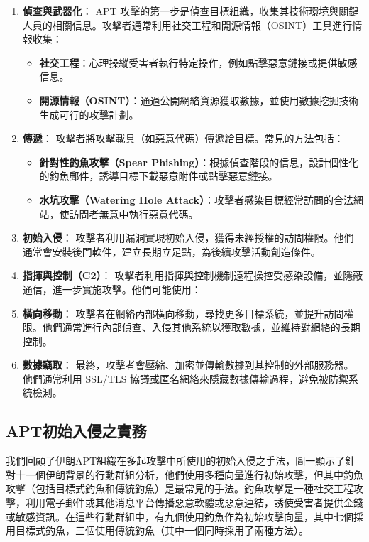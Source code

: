 \documentclass[a4paper,12pt]{article}
\begin{document}
\begin{enumerate}
    \item \textbf{偵查與武器化}：
    APT 攻擊的第一步是偵查目標組織，收集其技術環境與關鍵人員的相關信息。攻擊者通常利用社交工程和開源情報（OSINT）工具進行情報收集：
    \begin{itemize}
        \item \textbf{社交工程}：心理操縱受害者執行特定操作，例如點擊惡意鏈接或提供敏感信息。
        \item \textbf{開源情報（OSINT）}：通過公開網絡資源獲取數據，並使用數據挖掘技術生成可行的攻擊計劃。
    \end{itemize}

    \item \textbf{傳遞}：
    攻擊者將攻擊載具（如惡意代碼）傳遞給目標。常見的方法包括：
    \begin{itemize}
        \item \textbf{針對性釣魚攻擊（Spear Phishing）}：根據偵查階段的信息，設計個性化的釣魚郵件，誘導目標下載惡意附件或點擊惡意鏈接。
        \item \textbf{水坑攻擊（Watering Hole Attack）}：攻擊者感染目標經常訪問的合法網站，使訪問者無意中執行惡意代碼。
    \end{itemize}

    \item \textbf{初始入侵}：
    攻擊者利用漏洞實現初始入侵，獲得未經授權的訪問權限。他們通常會安裝後門軟件，建立長期立足點，為後續攻擊活動創造條件。

    \item \textbf{指揮與控制（C2）}：
    攻擊者利用指揮與控制機制遠程操控受感染設備，並隱蔽通信，進一步實施攻擊。他們可能使用：

    \item \textbf{橫向移動}：
    攻擊者在網絡內部橫向移動，尋找更多目標系統，並提升訪問權限。他們通常進行內部偵查、入侵其他系統以獲取數據，並維持對網絡的長期控制。

    \item \textbf{數據竊取}：
    最終，攻擊者會壓縮、加密並傳輸數據到其控制的外部服務器。他們通常利用 SSL/TLS 協議或匿名網絡來隱藏數據傳輸過程，避免被防禦系統檢測。\cite{2014aptstudy}
\end{enumerate}


\subsection{APT初始入侵之實務}
我們回顧了伊朗APT組織在多起攻擊中所使用的初始入侵之手法，圖一顯示了針對十一個伊朗背景的行動群組分析，他們使用多種向量進行初始攻擊，但其中釣魚攻擊（包括目標式釣魚和傳統釣魚）是最常見的手法。釣魚攻擊是一種社交工程攻擊，利用電子郵件或其他消息平台傳播惡意軟體或惡意連結，誘使受害者提供金錢或敏感資訊。在這些行動群組中，有九個使用釣魚作為初始攻擊向量，其中七個採用目標式釣魚，三個使用傳統釣魚（其中一個同時採用了兩種方法）。\cite{iranianAPT}
\end{document}
